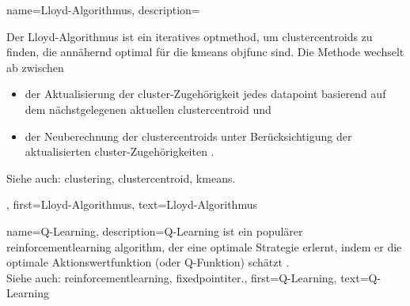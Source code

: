 {{{{ 
{
    name={Lloyd-Algorithmus}, 
    description={Der Lloyd-Algorithmus ist ein iteratives \gls{optmethod}, 
       um \glspl{clustercentroid} zu finden, die annähernd optimal für die \gls{kmeans} \gls{objfunc} sind. 
       Die Methode wechselt ab zwischen
       \begin{itemize} 
            \item der Aktualisierung der \gls{cluster}-Zugehörigkeit jedes \gls{datapoint} basierend auf dem nächstgelegenen aktuellen \gls{clustercentroid} und 
            \item der Neuberechnung der \glspl{clustercentroid} unter Berücksichtigung der aktualisierten \gls{cluster}-Zugehörigkeiten \cite{Lloyd1982}.
        \end{itemize}
        Siehe auch: \gls{clustering}, \gls{clustercentroid}, \gls{kmeans}.},
    first={Lloyd-Algorithmus},
    text={Lloyd-Algorithmus} 
}

{
    name={Q-Learning}, 
    description={Q-Learning ist ein populärer \gls{reinforcementlearning} \gls{algorithm}, 
         der eine optimale Strategie erlernt, indem er die optimale Aktionswertfunktion (oder Q-Funktion) schätzt \cite{SuttonEd2}.  \\
        Siehe auch: \gls{reinforcementlearning}, \gls{fixedpointiter}.},
    first={Q-Learning},
    text={Q-Learning} 
}

}}}}
